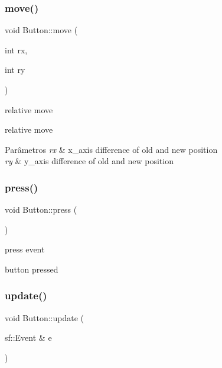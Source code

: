 \mbox{\label{classButton_ab6b0888289d2b733a1e1066578aac900}} 
\subsubsection{\texorpdfstring{move()}{move()}}
{\footnotesize\ttfamily void Button\+::move (\begin{DoxyParamCaption}\item[{int}]{rx,  }\item[{int}]{ry }\end{DoxyParamCaption})}



relative move 

relative move 
\begin{DoxyParams}{Parâmetros}
{\em rx} & x\+\_\+axis difference of old and new position \\
\hline
{\em ry} & y\+\_\+axis difference of old and new position \\
\hline
\end{DoxyParams}
\mbox{\label{classButton_af1464b95c6e43e125904b46670272ed2}} 
\subsubsection{\texorpdfstring{press()}{press()}}
{\footnotesize\ttfamily void Button\+::press (\begin{DoxyParamCaption}{ }\end{DoxyParamCaption})\hspace{0.3cm}{\ttfamily [private]}}



press event 

button pressed \mbox{\label{classButton_aaf2f85db7d93b19783f9e859ad58e185}} 
\subsubsection{\texorpdfstring{update()}{update()}}
{\footnotesize\ttfamily void Button\+::update (\begin{DoxyParamCaption}\item[{sf\+::\+Event \&}]{e }\end{DoxyParamCaption})}



